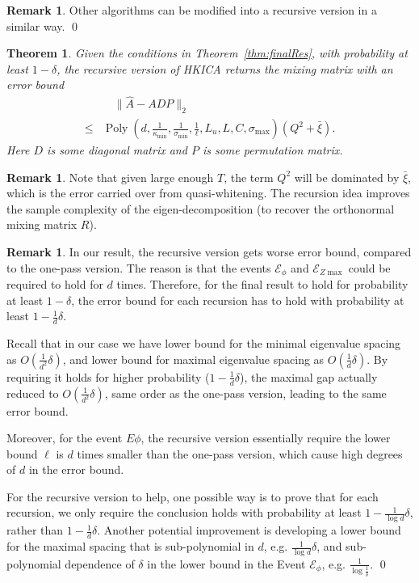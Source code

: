 \documentclass{article}
\newcommand{\Ephi}{\mathcal{E}_{\phi}}
\newcommand{\Ez}{\mathcal{E}_{Z\max}}
\DeclareMathOperator{\pol}{Poly}
\newcommand{\poly}[1]{\pol\left(#1\right)}
\newtheorem{thm}[lemma]{Theorem}
\theoremstyle{definition}
\newtheorem{remark}[lemma]{Remark}
\begin{document}
\begin{remark}
Other algorithms can be modified into a recursive version in a similar way. 
\qed
\end{remark}
\begin{thm}
\label{thm:recursiveAlg}
Given the conditions in Theorem~\ref{thm:finalRes}, with probability at least $1-\delta$, the recursive version of HKICA returns the mixing matrix with an error bound
\begin{align*}
& \quad \| \hat{A} - ADP\|_2 \\
\le & \poly{d,\frac{1}{\kappa_{\min}}, \frac{1}{\sigma_{\min}}, \frac{1}{\ell}, L_u, L, C, \sigma_{\max}}(Q^2 + \bar{\xi}).
\end{align*}
Here $D$ is some diagonal matrix and $P$ is some permutation matrix.
\end{thm} 
\begin{remark}
Note that given large enough $T$, the term $Q^2$ will be dominated by $\bar{\xi}$, which is the error carried over from quasi-whitening.
The recursion idea improves the sample complexity of the eigen-decomposition (to recover the orthonormal mixing matrix $R$).  
\end{remark}

\begin{remark}
In our result, the recursive version gets worse error bound, compared to the one-pass version. The reason is that the events $\Ephi$ and $\Ez$ could be required to hold for $d$ times. Therefore, for the final result to hold for probability at least $1-\delta$, the error bound for each recursion has to hold with probability at least $1-\frac{1}{d}\delta$. 

Recall that in our case we have lower bound for the minimal eigenvalue spacing as $O(\frac{1}{d^2}\delta)$, and lower bound for maximal eigenvalue spacing as $O(\frac{1}{d}\delta)$. By requiring it holds for higher probability ($1-\frac{1}{d}\delta$), the maximal gap actually reduced to $O(\frac{1}{d^2}\delta)$, same order as the one-pass version, leading to the same error bound.

Moreover, for the event $E\phi$, the recursive version essentially require the lower bound $\ell$ is $d$ times smaller than the one-pass version, which cause high degrees of $d$ in the error bound.

For the recursive version to help, one possible way is to prove that for each recursion, we only require the conclusion holds with probability at least $1-\frac{1}{\log d}\delta$, rather than $1-\frac{1}{d}\delta$. 
Another potential improvement is developing a lower bound for the maximal spacing that is sub-polynomial in $d$, e.g. $\frac{1}{\log d}\delta$, and sub-polynomial dependence of $\delta$ in the lower bound in the Event $\Ephi$, e.g. $\frac{1}{\log \frac{1}{\delta}}$.    
\qed
\end{remark}
\fi
\end{document}
